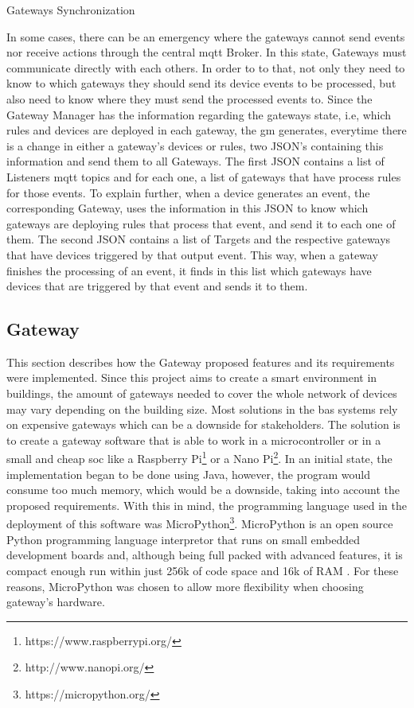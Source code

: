 \begin{Paragraph}{Gateways Synchronization}

In some cases, there can be an emergency where the gateways cannot send events nor receive actions through the central \ac{mqtt} Broker. In this state, Gateways must communicate directly with each others. In order to to that, not only they need to know to which gateways they should send its device events to be processed, but also need to know where they must send the processed events to. Since the Gateway Manager has the information regarding the gateways state, i.e, which rules and devices are deployed in each gateway, the \ac{gm} generates, everytime there is a change in either a gateway's devices or rules, two JSON's containing this information and send them to all Gateways. The first JSON contains a list of Listeners \ac{mqtt} topics and for each one, a list of gateways that have process rules for those events. To explain further, when a device generates an event, the corresponding Gateway, uses the information in this JSON to know which gateways are deploying rules that process that event, and send it to each one of them. The second JSON contains a list of Targets and the respective gateways that have devices triggered by that output event. This way, when a gateway finishes the processing of an event, it finds in this list which gateways have devices that are triggered by that event and sends it to them.
 
\end{Paragraph}


\subsection{Gateway}
\label{arch:gw}

This section describes how the Gateway proposed features and its requirements were implemented. Since this project aims to create a smart environment in buildings, the amount of gateways needed to cover the whole network of devices may vary depending on the building size. Most solutions in the \ac{bas} systems rely on expensive gateways which can be a downside for stakeholders. The solution is to create a gateway software that is able to work in a microcontroller or in a small and cheap \ac{soc} like a Raspberry Pi\footnote{https://www.raspberrypi.org/} or a Nano Pi\footnote{http://www.nanopi.org/}. In an initial state, the implementation began to be done using Java, however, the program would consume too much memory, which would be a downside, taking into account the proposed requirements. With this in mind, the programming language used in the deployment of this software was MicroPython\footnote{https://micropython.org/}. MicroPython is an open source Python programming language interpretor that runs on small embedded development boards \cite{micro2} and, although being full packed with advanced features, it is compact enough run within just 256k of code space and 16k of RAM \cite{micro}. For these reasons, MicroPython was chosen to allow more flexibility when choosing gateway's hardware.

